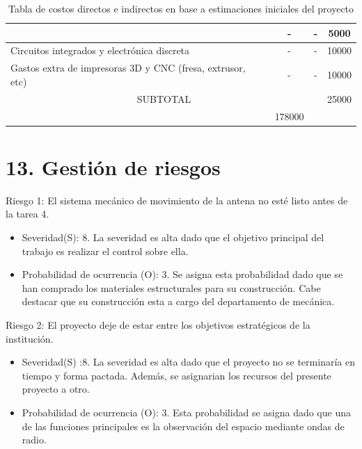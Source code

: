 \documentclass[11pt, %
codirector, %
]{charter}
\begin{document}
\begin{table}[htpb]
\begin{tabularx}{\linewidth}{@{}|X|c|r|r|@{}}
& \multicolumn{1}{c|}{-}
& \multicolumn{1}{c|}{-}
& \multicolumn{1}{c|}{5000}   \\ \hline
Circuitos integrados y electrónica discreta
& \multicolumn{1}{c|}{-}
& \multicolumn{1}{c|}{-}
& \multicolumn{1}{c|}{10000}   \\ \hline
Gastos extra de impresoras 3D y CNC (fresa, extrusor, etc)  
& \multicolumn{1}{c|}{-}
& \multicolumn{1}{c|}{-}
& \multicolumn{1}{c|}{10000}   \\ \hline
\multicolumn{3}{|c|}{SUBTOTAL} &
\multicolumn{1}{c|}{25000} \\ \hline 
\rowcolor[HTML]{C0C0C0} 
\multicolumn{3}{|c|}{TOTAL} &
\multicolumn{1}{c|}{178000} \\ \hline

%

\end{tabularx}%

\caption{Tabla de costos directos e indirectos en base a estimaciones iniciales del proyecto}
\end{table}


\section{13. Gestión de riesgos}
\label{sec:riesgos}

Riesgo 1: El sistema mecánico de movimiento de la antena no esté listo antes de la tarea 4.
\begin{itemize}
	\item Severidad(S): 8.\newline
		La severidad es alta dado que el objetivo principal del trabajo es realizar el control sobre ella.
	\item Probabilidad de ocurrencia (O): 3. \newline
	 Se asigna esta probabilidad dado que se han comprado los materiales estructurales para su construcción. Cabe destacar que su construcción esta a cargo del departamento de mecánica. 
\end{itemize}

Riesgo 2: El proyecto deje de estar entre los objetivos estratégicos de la institución.
\begin{itemize}
	\item Severidad(S) :8.\newline
	La severidad es alta dado que el proyecto no se terminaría en tiempo y forma pactada. Además, se asignarian los recursos del presente proyecto a otro. 
	\item Probabilidad de ocurrencia (O): 3. \newline
	Esta probabilidad se asigna dado que una de las funciones principales es la observación del espacio mediante ondas de radio.  
\end{itemize}
\end{document}
